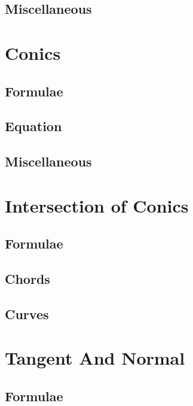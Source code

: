 \documentclass[journal]{IEEEtran}
\begin{document}
\subsection{Miscellaneous}

\newpage
\section{Conics}
\subsection{Formulae}

\subsection{Equation}

%
\subsection{Miscellaneous}

\newpage
\section{Intersection of Conics}
\subsection{Formulae}

\subsection{Chords}

\subsection{Curves}


\newpage
\section{Tangent And Normal}
\subsection{Formulae}

\end{document}
